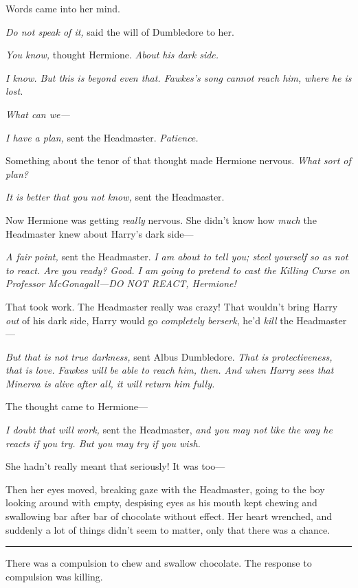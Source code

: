 Words came into her mind.

\emph{Do not speak of it,} said the will of Dumbledore to her.

\emph{You know,} thought Hermione. \emph{About his dark side.}

\emph{I know. But this is beyond even that. Fawkes's song cannot reach
him, where he is lost.}

\emph{What can we---}

\emph{I have a plan,} sent the Headmaster. \emph{Patience.}

Something about the tenor of that thought made Hermione nervous.
\emph{What sort of plan?}

\emph{It is better that you not know,} sent the Headmaster.

Now Hermione was getting \emph{really} nervous. She didn't know how
\emph{much} the Headmaster knew about Harry's dark side---

\emph{A fair point,} sent the Headmaster. \emph{I am about to tell you;
steel yourself so as not to react. Are you ready? Good. I am going to
pretend to cast the Killing Curse on Professor McGonagall---DO NOT
REACT, Hermione!}

That took work. The Headmaster really was crazy! That wouldn't bring
Harry \emph{out} of his dark side, Harry would go \emph{completely
berserk}, he'd \emph{kill} the Headmaster---

\emph{But that is not true darkness,} sent Albus Dumbledore. \emph{That
is protectiveness, that is love. Fawkes will be able to reach him, then.
And when Harry sees that Minerva is alive after all, it will return him
fully.}

The thought came to Hermione---

\emph{I doubt that will work,} sent the Headmaster, \emph{and you may
not like the way he reacts if you try. But you may try if you wish.}

She hadn't really meant that seriously! It was too---

Then her eyes moved, breaking gaze with the Headmaster, going to the boy
looking around with empty, despising eyes as his mouth kept chewing and
swallowing bar after bar of chocolate without effect. Her heart
wrenched, and suddenly a lot of things didn't seem to matter, only that
there was a chance.

\begin{center}\rule{3in}{0.4pt}\end{center}

There was a compulsion to chew and swallow chocolate. The response to
compulsion was killing.

